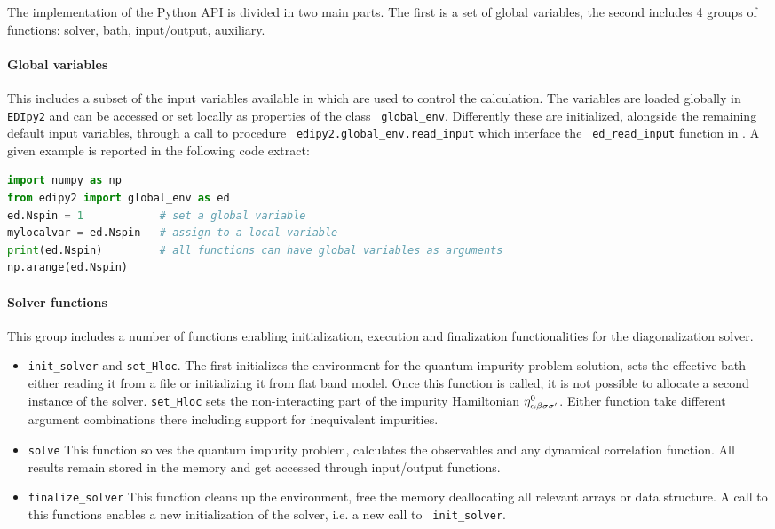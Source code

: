 \documentclass[edipack2.tex]{subfiles}
\begin{document}
The implementation of the Python API is divided in two main parts. The
first is a set of global variables, the second includes 4 groups of
functions: solver, bath, input/output, auxiliary. 

\paragraph{{\bf Global variables}}
This includes a subset of the input variables available in \NAME which
are used to control the calculation.
The variables are loaded globally in {\tt EDIpy2} and can be accessed
or set locally as properties of the class {\tt
  global\_env}. Differently these are initialized, alongside the remaining
default input variables, through a call to procedure {\tt
  edipy2.global\_env.read\_input} which interface the {\tt
  ed\_read\_input} function in \NAME. 
A given example is reported in the following code extract:

\begin{lstlisting}[language=python,  frame=lines]
import numpy as np
from edipy2 import global_env as ed
ed.Nspin = 1            # set a global variable
mylocalvar = ed.Nspin   # assign to a local variable
print(ed.Nspin)         # all functions can have global variables as arguments
np.arange(ed.Nspin)
\end{lstlisting}


\paragraph{{\bf Solver functions}}
This group includes a number of functions enabling initialization,
execution and finalization  functionalities for the diagonalization
solver.
\begin{itemize}
  \item {\tt init\_solver} and {\tt set\_Hloc}. The first 
    initializes the \NAME environment for the quantum impurity problem
    solution, sets the effective bath either reading it from a file or
    initializing it from flat band model. Once this function is
    called, it is not possible to allocate a second instance of the solver.
    {\tt set\_Hloc} sets the
    non-interacting part of the impurity Hamiltonian $\eta^0_{\alpha\beta\sigma\sigma'}$. 
    Either function take different argument combinations there
    including support for inequivalent impurities.

  \item {\tt solve} This function solves the quantum impurity problem,
    calculates the observables and any dynamical correlation
    function. All results remain stored in the memory and get accessed
    through input/output functions.

  \item {\tt finalize\_solver} This function cleans up the \NAME
    environment, free the memory deallocating all relevant arrays or
    data structure. A call to this functions enables a new
    initialization of the solver, i.e. a new call to {\tt
      init\_solver}.  
  \end{itemize}
\end{document}
